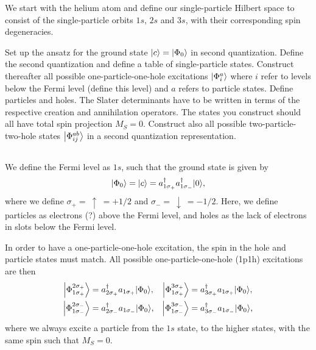 We start with the helium atom and define our single-particle Hilbert
space to consist of the single-particle orbits \(1s\), \(2s\) and \(3s\),
with their corresponding spin degeneracies.

Set up the ansatz for the ground state \(\ket*{c} = \ket*{\Phi_0}\) in second quantization.
Define the second quantization and define a table of single-particle states.
Construct thereafter all possible one-particle-one-hole
excitations \(\ket*{\Phi_i^a}\) where \(i\) refer to levels below the Fermi level (define this level) and \(a\) refers to particle states.
Define particles and holes.
The Slater determinants have to be written in terms of the respective creation and annihilation operators.
The states you construct should all have total spin projection \(M_S=0\).
Construct also all possible two-particle-two-hole states \(\ket*{\Phi_{ij}^{ab}}\) in a second quantization
representation.

\subsection{}
We define the Fermi level as \(1s\), such that the ground state is given by
\begin{equation}
    \ket*{\Phi_0} = \ket*{c} = a_{1\sigma_{+}}^\dagger a_{1\sigma_{-}}^\dagger \ket*{0},
\end{equation}
where we define $\sigma_{+} = \ \uparrow \ = +1/2$ and $\sigma_{-} = \ \downarrow \ = -1/2$.
Here, we define particles as electrons (?) above the Fermi level, and holes as the lack of electrons in slots below the Fermi level.

In order to have a one-particle-one-hole excitation, the spin in the hole and particle states must match.
All possible one-particle-one-hole (1p1h) excitations are then
\begin{align*}
    \ket*{\Phi_{1\sigma_{+}}^{2\sigma_{+}}} &= a_{2\sigma_{+}}^\dagger a_{1\sigma_{+}} \ket*{\Phi_0}, &
    \ket*{\Phi_{1\sigma_{+}}^{3\sigma_{+}}} &= a_{3\sigma_{+}}^\dagger a_{1\sigma_{+}} \ket*{\Phi_0}, \\
    \ket*{\Phi_{1\sigma_{-}}^{2\sigma_{-}}} &= a_{2\sigma_{-}}^\dagger a_{1\sigma_{-}} \ket*{\Phi_0}, &
    \ket*{\Phi_{1\sigma_{-}}^{3\sigma_{-}}} &= a_{3\sigma_{-}}^\dagger a_{1\sigma_{-}} \ket*{\Phi_0},
\end{align*}
where we always excite a particle from the $1s$ state, to the higher states, with the same spin such that $M_S = 0$.

